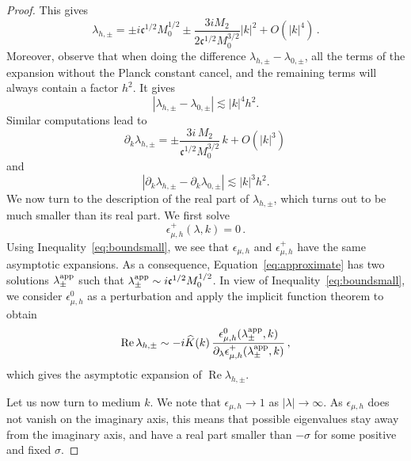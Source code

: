 \documentclass[a4paper,12pt]{amsart} %
\theoremstyle{plain}
\theoremstyle{definition}
\newcommand		{\lt}			{\left}				%
\newcommand		{\rt}			{\right}			%
\renewcommand	{\(}			{\lt(}
\renewcommand	{\)}			{\rt)}
\newcommand		{\n}[1]			{\lt\lvert{#1}\rt\rvert}	%
\DeclareMathOperator{\re}		{Re}				%
\newcommand	{\h}			{h}
\newcommand		{\CK}			{\mathfrak{c}}	%
\begin{document}
\begin{proof}
		This gives
		\begin{equation*}
		\lambda_{\h,\pm} = \pm i \CK^{1/2} M_0^{1/2}
		\pm \frac{3 i M_2}{2 \CK^{1/2} M_0^{3/2}} \n{k}^2 + O(\n{k}^4) \, .
		\end{equation*}
		Moreover, observe that when doing the difference $\lambda_{\h,\pm} - \lambda_{0,\pm}$, all the terms of the expansion without the Planck constant cancel, and the remaining terms will always contain a factor $h^2$. It gives
		\begin{equation*}
			\n{\lambda_{\h,\pm} - \lambda_{0,\pm}} \lesssim \n{k}^4 h^2 .
		\end{equation*}
		Similar computations lead to
		\begin{equation*}
			\partial_k \lambda_{\h,\pm} = \pm \frac{3 i\, M_2}{ \CK^{1/2} M_0^{3/2}}\, k + O(\n{k}^3) \, 
		\end{equation*}
		and
		\begin{equation*}
			\n{\partial_k \lambda_{\h,\pm} - \partial_k \lambda_{0,\pm}} \lesssim \n{k}^3 h^2 .
		\end{equation*}
		We now turn to the description of the real part of $\lambda_{\h,\pm}$, which turns out to be much smaller than its real part.
		We first solve 
		\begin{equation} \label{eq:approximate}
			\epsilon_{\mu,\h}^+(\lambda,k) = 0 \, .
		\end{equation}
		Using Inequality~\eqref{eq:boundsmall}, we see that $\epsilon_{\mu,\h}$ and $\epsilon_{\mu,\h}^+$ have the same asymptotic expansions. As a consequence, Equation~\eqref{eq:approximate} has two solutions $\lambda^{\textnormal{app}}_\pm$ such that $\lambda^{\textnormal{app}}_\pm \sim i \CK^{1/2} M_0^{1/2}$. In view of Inequality~\eqref{eq:boundsmall}, we consider $\epsilon_{\mu,\h}^0$ as a perturbation and apply the implicit function theorem to obtain
		\begin{equation*}
			\re \lambda_{\h,\pm} \sim - i \widehat{K}(k) \, \frac{\epsilon_{\mu,\h}^0(\lambda^{\textnormal{app}}_\pm,k)}{\partial_\lambda \epsilon_{\mu,\h}^+(\lambda^{\textnormal{app}}_\pm,k)} \, ,
		\end{equation*}
		which gives the asymptotic expansion of $\re \lambda_{\h,\pm}$.
	
		Let us now turn to medium $k$. We note that $\epsilon_{\mu,\h} \to 1$ as $\n{\lambda} \to \infty$. As $\epsilon_{\mu,\h}$ does not vanish on the imaginary axis, this means that possible eigenvalues stay away from the imaginary axis, and have a real part smaller than $- \sigma$ for some positive and fixed $\sigma$.
	\end{proof}
\end{document}
